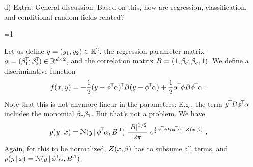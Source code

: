 d) Extra: General discussion: Based on this, how are regression, classification, and conditional random fields related?


\ifnum\value{solutions}=1
\begin{solution}
Let us define $y=(y_1,y_2)\in{\mathbb{R}}^2$, the regression parameter matrix
$\alpha=(\beta_1^{\!\top\!};\beta_2^{\!\top\!}) \in {\mathbb{R}}^{d\times 2}$, and the correlation
matrix $B=(1,\beta_c; \beta_c,1)$. We define a discriminative function
\begin{align}
f(x,y)
 &= -\half (y-\phi^\T\a)^\T B (y-\phi^\T\a) + \half \a^\T \phi B \phi^\T\a ~.
\end{align}
Note that this is not anymore linear in the parameters: E.g., the term $y^{\!\top\!}
B \phi^{\!\top\!} \alpha$ includes the monomial $\beta_c\beta_1$. But that's not a
problem. We have
\begin{align}
p(y \,|\, x)
&= {\cal N}(y \,|\, \phi^{\!\top\!}\alpha, B^{{\hspace*{-.0pt}\text{\rm -}\hspace*{-.5pt}}1})~ \frac{|B|^{1/2}}{2\pi}~ e^{\frac{1}{2} \alpha^{\!\top\!} \phi B \phi^{\!\top\!}\alpha - Z(x,\beta)} ~.
\end{align}
Again, for this to be normalized, $Z(x,\beta)$ has to subsume all terms,
and $p(y \,|\, x) = {\cal N}(y \,|\, \phi^{\!\top\!}\alpha, B^{{\hspace*{-.0pt}\text{\rm -}\hspace*{-.5pt}}1})$.
\end{solution}
\fi








